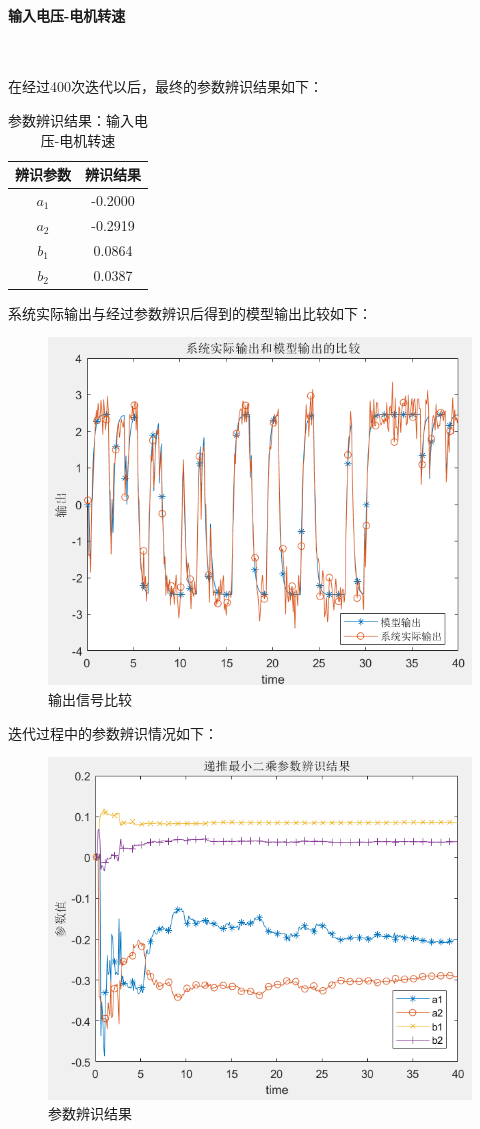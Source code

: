 \documentclass[UTF8, twocolumn]{article}
\begin{document}
\paragraph{输入电压-电机转速}~{}

在经过400次迭代以后，最终的参数辨识结果如下：
\begin{table}[H] %
\centering %
\begin{tabular}{cc} %
	\toprule %
	辨识参数 & 辨识结果 \\
	\midrule %
	$a_1$ & -0.2000 \\
	$a_2$ & -0.2919 \\
	$b_1$ & 0.0864 \\
	$b_2$ & 0.0387 \\
	\bottomrule %
\end{tabular}
\caption{参数辨识结果：输入电压-电机转速} %
\end{table}

系统实际输出与经过参数辨识后得到的模型输出比较如下：
\begin{figure}[H]
    \centering %
    \includegraphics[width=.4\textwidth]{figure/最小二乘-电机转速-输出比较.png} 
    \caption{输出信号比较} %
\end{figure}

迭代过程中的参数辨识情况如下：
\begin{figure}[H]
    \centering %
    \includegraphics[width=.4\textwidth]{figure/最小二乘-电机转速-参数辨识结果.png} 
    \caption{参数辨识结果} %
\end{figure}
\end{document}
